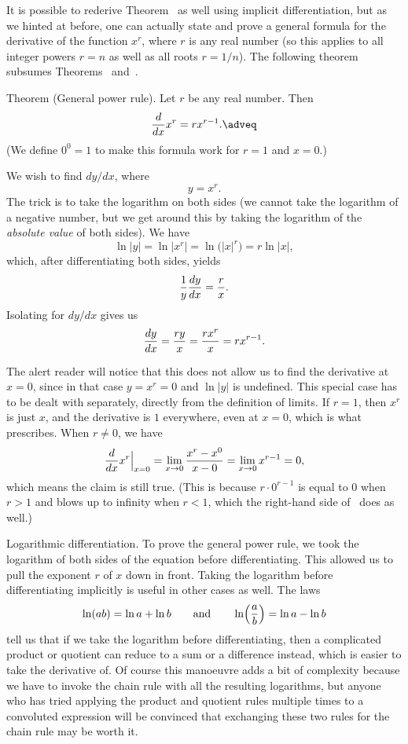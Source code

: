 It is possible to
rederive Theorem~{\thmrootrule} as well using implicit differentiation, but as we hinted at before,
one can actually state and prove a
general formula for the derivative of the function $x^r$, where $r$ is any real number
(so this applies to all integer powers $r=n$ as well as all roots $r=1/n$). The following theorem subsumes
Theorems~{\thmpowerrule} and~{\thmrootrule}.

\edef\thmgeneralpowerrule{\the\thmcount}
\parenproclaim Theorem {\advthm} (General power rule). Let $r$ be any real number. Then
\global\edef\eqpowerrule{\the\eqcount}
$${d\over dx} x^r = rx^{r-1}.\adveq$$
(We define $0^0 = 1$ to make this formula work for $r=1$ and $x=0$.)

\proof We wish to find $dy/dx$, where
$$y = x^r.$$
The trick is to take the logarithm on both sides (we cannot take the logarithm of a negative number, but
we get around this by taking the logarithm of the {\it absolute value} of both sides).
We have
$$\ln|y| = \ln|x^r| = \ln \bigl( |x|^r\bigr) = r\ln |x|,$$
which, after differentiating both sides, yields
$$ {1\over y} {dy\over dx} = {r\over x}.$$
Isolating for $dy/dx$ gives us
$$ {dy\over dx} = {ry\over x} = {rx^r\over x} = rx^{r-1}.$$

The alert reader will notice that this does not allow us to find the derivative at $x=0$, since in that
case $y = x^r = 0$ and $\ln|y|$ is undefined. This special case has to be dealt with separately, directly
from the definition of limits. If $r=1$, then $x^r$ is just $x$, and the derivative is $1$ everywhere,
even at $x=0$, which is what~\refeq{\eqpowerrule} prescribes.
When $r\ne 0$, we have
$${d\over dx} x^r \Big|_{x=0} = \lim_{x\to 0} {x^r - x^0 \over x-0} = \lim_{x\to 0} x^{r-1} = 0,$$
which means the claim is still true. (This is because
$r\cdot 0^{r-1}$ is equal to $0$ when $r>1$ and blows up
to infinity when $r<1$, which the right-hand side of~\refeq{\eqpowerrule} does as well.)\slug

\medskip\boldlabel {} Logarithmic differentiation.
To prove the general power rule, we took the logarithm
of both sides of the equation before differentiating. This allowed us to pull the exponent $r$ of $x$
down in front. Taking the logarithm before differentiating implicitly is useful in other cases as well.
The laws
$$\ln(ab) = \ln a + \ln b\qquad\hbox{and}\qquad \ln\Bigl({a\over b}\Bigr) = \ln a - \ln b$$
tell us that if we take the logarithm before differentiating, then a complicated product or quotient
can reduce to a sum or a difference instead, which is easier to take the derivative of.
Of course this manoeuvre adds a bit of complexity because we have to invoke
the chain rule with all the resulting logarithms,
but anyone who has tried applying the product and quotient rules multiple times to a
convoluted expression will be convinced that exchanging these two rules for the chain rule may be worth it.

